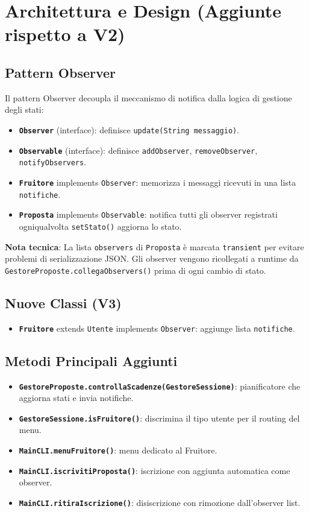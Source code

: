 \section{Architettura e Design (Aggiunte rispetto a V2)}

\subsection{Pattern Observer}
Il pattern Observer decoupla il meccanismo di notifica dalla logica di gestione degli stati:
\begin{itemize}
    \item \textbf{\texttt{Observer}} (interface): definisce \texttt{update(String messaggio)}.
    \item \textbf{\texttt{Observable}} (interface): definisce \texttt{addObserver}, \texttt{removeObserver}, \texttt{notifyObservers}.
    \item \textbf{\texttt{Fruitore}} implements \texttt{Observer}: memorizza i messaggi ricevuti in una lista \texttt{notifiche}.
    \item \textbf{\texttt{Proposta}} implements \texttt{Observable}: notifica tutti gli observer registrati ogniqualvolta \texttt{setStato()} aggiorna lo stato.
\end{itemize}

\textbf{Nota tecnica}: La lista \texttt{observers} di \texttt{Proposta} è marcata \texttt{transient} per evitare problemi di serializzazione JSON. Gli observer vengono ricollegati a runtime da \texttt{GestoreProposte.collegaObservers()} prima di ogni cambio di stato.

\subsection{Nuove Classi (V3)}
\begin{itemize}
    \item \textbf{\texttt{Fruitore}} extends \texttt{Utente} implements \texttt{Observer}: aggiunge lista \texttt{notifiche}.
\end{itemize}

\subsection{Metodi Principali Aggiunti}
\begin{itemize}
    \item \textbf{\texttt{GestoreProposte.controllaScadenze(GestoreSessione)}}: pianificatore che aggiorna stati e invia notifiche.
    \item \textbf{\texttt{GestoreSessione.isFruitore()}}: discrimina il tipo utente per il routing del menu.
    \item \textbf{\texttt{MainCLI.menuFruitore()}}: menu dedicato al Fruitore.
    \item \textbf{\texttt{MainCLI.iscrivitiProposta()}}: iscrizione con aggiunta automatica come observer.
    \item \textbf{\texttt{MainCLI.ritiraIscrizione()}}: disiscrizione con rimozione dall'observer list.
\end{itemize}


